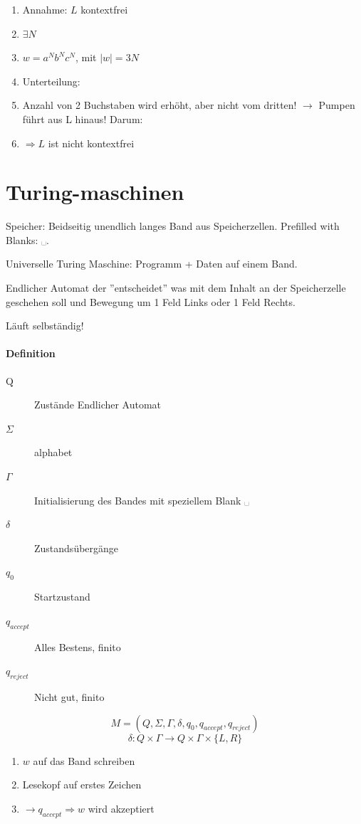 \begin{enumerate}
	\item Annahme: $L$ kontextfrei
	\item $\exists N$
	\item $w = a^N b^N c^N$, mit $|w| = 3N$
	\item Unterteilung: %
	\item Anzahl von 2 Buchstaben wird erhöht, aber nicht vom dritten!
		$\rightarrow$ Pumpen führt aus L hinaus! Darum:
	\item $\Rightarrow L$ ist nicht kontextfrei
\end{enumerate}

\section{Turing-maschinen}

Speicher: Beidseitig unendlich langes Band aus Speicherzellen. Prefilled with Blanks: ␣.

Universelle Turing Maschine: Programm + Daten auf einem Band.

Endlicher Automat der ''entscheidet'' was mit dem Inhalt an der Speicherzelle geschehen soll und Bewegung um 1 Feld Links oder 1 Feld Rechts.


Läuft selbständig!

\paragraph{Definition}
\begin{description}
	\item[Q] Zustände Endlicher Automat
	\item[$\Sigma$]alphabet
	\item [$\Gamma$] Initialisierung des Bandes mit speziellem Blank ␣
	\item[$\delta$] Zustandsübergänge
	\item[$q_0$] Startzustand
	\item[$q_{accept}$] Alles Bestens, finito
	\item[$q_{reject}$] Nicht gut, finito
\end{description}

\[
	M=(Q, \Sigma, \Gamma, \delta, q_0, q_{accept}, q_{reject})
\]
\[
	\delta: Q \times \Gamma \rightarrow Q \times \Gamma \times \{L, R\}
\]


\begin{enumerate}
	\item $w$ auf das Band schreiben
	\item Lesekopf auf erstes Zeichen
	\item $\rightarrow q_{accept} \Rightarrow w$ wird akzeptiert
\end{enumerate}

